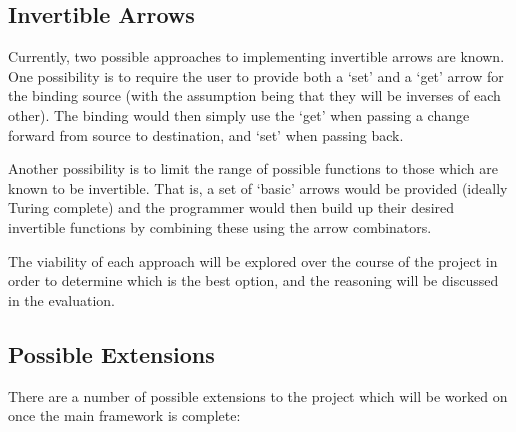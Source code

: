	\subsection*{Invertible Arrows}
		Currently, two possible approaches to implementing invertible arrows are known. One possibility is to require the user to provide both a `set' and a `get' arrow for the binding source (with the assumption being that they will be inverses of each other). The binding would then simply use the `get' when passing a change forward from source to destination, and `set' when passing back.
		
		Another possibility is to limit the range of possible functions to those which are known to be invertible. That is, a set of `basic' arrows would be provided (ideally Turing complete) and the programmer would then build up their desired invertible functions by combining these using the arrow combinators.
		
		The viability of each approach will be explored over the course of the project in order to determine which is the best option, and the reasoning will be discussed in the evaluation.
	
	\subsection*{Possible Extensions}
		There are a number of possible extensions to the project which will be worked on once the main framework is complete:
		
